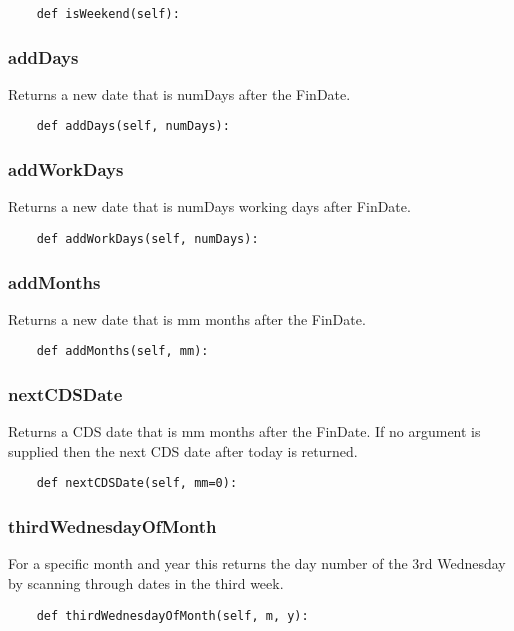 \documentclass[twoside,11pt]{book}
\begin{document}
\begin{lstlisting}
    def isWeekend(self):
\end{lstlisting}

\subsubsection*{{\bf addDays}}
Returns a new date that is numDays after the FinDate.  

\begin{lstlisting}
    def addDays(self, numDays):
\end{lstlisting}

\subsubsection*{{\bf addWorkDays}}
Returns a new date that is numDays working days after FinDate.  

\begin{lstlisting}
    def addWorkDays(self, numDays):
\end{lstlisting}

\subsubsection*{{\bf addMonths}}
Returns a new date that is mm months after the FinDate.  

\begin{lstlisting}
    def addMonths(self, mm):
\end{lstlisting}

\subsubsection*{{\bf nextCDSDate}}
Returns a CDS date that is mm months after the FinDate. If no argument is supplied then the next CDS date after today is returned. 

\begin{lstlisting}
    def nextCDSDate(self, mm=0):
\end{lstlisting}

\subsubsection*{{\bf thirdWednesdayOfMonth}}
For a specific month and year this returns the day number of the 3rd Wednesday by scanning through dates in the third week.  

\begin{lstlisting}
    def thirdWednesdayOfMonth(self, m, y):
\end{lstlisting}
\end{document}
